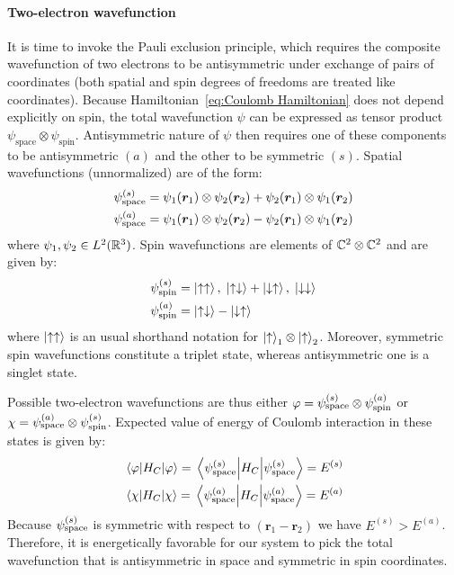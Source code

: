 \paragraph{Two-electron wavefunction}It is time to invoke the Pauli exclusion principle, which requires the composite wavefunction
of two electrons to be antisymmetric under exchange of pairs of coordinates (both spatial and
spin degrees of freedoms are treated like coordinates). Because 
Hamiltonian~\ref{eq:Coulomb Hamiltonian} does not depend explicitly on spin, the total
wavefunction \(\psi\) can be expressed as tensor product \(\psi_{\mathrm{space}} 
\otimes \psi_{\mathrm{spin}} \). Antisymmetric nature of \(\psi\) then requires one 
of these components to be antisymmetric \((a)\) and the other to be symmetric \((s)\). 
Spatial wavefunctions (unnormalized) are of the form:
\begin{align}
    &\psi_{\textrm{space}}^{(s)} = \psi_1(\bm{r}_1)\otimes \psi_2(\bm{r}_2) +
    \psi_2(\bm{r}_1)\otimes \psi_1(\bm{r}_2) \\
    &\psi_{\textrm{space}}^{(a)} = \psi_1(\bm{r}_1)\otimes \psi_2(\bm{r}_2) -
    \psi_2(\bm{r}_1)\otimes \psi_1(\bm{r}_2)
\end{align}
where \(\psi_1,\psi_2 \in L^2(\mathbb{R}^3)\). Spin wavefunctions are elements of \(\mathbb{C}^2 \otimes \mathbb{C}^2\)
and are given by:
\begin{align}
    &\psi_{\textrm{spin}}^{(s)} = \ket{\uparrow\uparrow},\; 
    \ket{\uparrow\downarrow} + \ket{\downarrow\uparrow},\; \ket{\downarrow\downarrow} \\
    &\psi_{\textrm{spin}}^{(a)} = \ket{\uparrow\downarrow}-\ket{\downarrow\uparrow}
\end{align}
where \(\ket{\uparrow\uparrow}\) is an usual shorthand notation for \(\ket{\uparrow}_1 \otimes
\ket{\uparrow}_2\). Moreover, symmetric spin wavefunctions
constitute a triplet state, whereas antisymmetric one is a singlet state. 

Possible two-electron wavefunctions are thus either \(\varphi=\psi_{\textrm{space}}^{(s)}
\otimes \psi_{\textrm{spin}}^{(a)}\) or \(\chi = \psi_{\textrm{space}}^{(a)}
\otimes \psi_{\textrm{spin}}^{(s)}\). Expected value of energy of Coulomb interaction 
in these states is given by:
\begin{align}
    &\expectationvalue{H_C}{\varphi} = \expectationvalue{H_C}{\spas} = E^{(s)}\\
    &\expectationvalue{H_C}{\chi} = \expectationvalue{H_C}{\spaa} = E^{(a)} 
\end{align}
Because \(\psi_{\textrm{space}}^{(s)}\) is symmetric with respect to \((\bm{r}_1-\bm{r}_2)\)
we have \(E^{(s)}>E^{(a)}\). Therefore, it is energetically
favorable for our system to pick the total wavefunction that is antisymmetric
in space and symmetric in spin coordinates.

